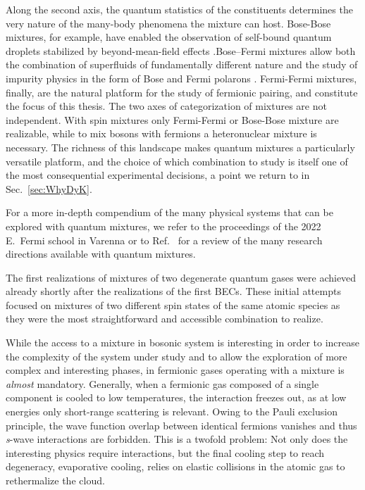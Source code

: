 Along the second axis, the quantum statistics of the constituents determines the very nature of the many-body phenomena the mixture can host. Bose-Bose mixtures, for example, have enabled the observation of self-bound quantum droplets stabilized by beyond-mean-field effects \cite{Cabrera2018qld, Semeghini2018sbq}.Bose–Fermi mixtures allow both the combination of superfluids of fundamentally different nature \cite{Ferrierbarbut2014amo, Wu2018cdo} and the study of impurity physics in the form of Bose and Fermi polarons \cite{Hu2016bpi, Schirotzek2009oof, Baroni2024mib, Kohstall2012mac}. Fermi-Fermi mixtures, finally, are the natural platform for the study of fermionic pairing, and constitute the focus of this thesis. The two axes of categorization of mixtures are not independent. With spin mixtures only Fermi-Fermi or Bose-Bose mixture are realizable, while to mix bosons with fermions a heteronuclear mixture is necessary. The richness of this landscape makes quantum mixtures a particularly versatile platform, and the choice of which combination to study is itself one of the most consequential experimental decisions, a point we return to in Sec.~\ref{sec:WhyDyK}. 


For a more in-depth compendium of the many physical systems that can be explored with quantum mixtures, we refer to the proceedings of the 2022 E.~Fermi school in Varenna \cite{Varenna2022book} or to Ref.~\cite{Baroni2024qmo} for a review of the many research directions available with quantum mixtures.


The first realizations of mixtures of two degenerate quantum gases were achieved already shortly after the realizations of the first \ac{BEC}s. These initial attempts focused on mixtures of two different spin states of the same atomic species \cite{Myatt1997pot, Stenger1998sdi} as they were the most straightforward and accessible combination to realize. 

While the access to a mixture in bosonic system is interesting in order to increase the complexity of the system under study and to allow the exploration of more complex and interesting phases, in fermionic gases operating with a mixture is \textit{almost} mandatory. Generally, when a fermionic gas composed of a single component is cooled to low temperatures, the interaction freezes out, as at low energies only short-range scattering is relevant. Owing to the Pauli exclusion principle, the wave function overlap between identical fermions vanishes and thus \textit{s}-wave interactions are forbidden. This is a twofold problem: Not only does the interesting physics require interactions, but the final cooling step to reach degeneracy, evaporative cooling, relies on elastic collisions in the atomic gas to rethermalize the cloud. 

